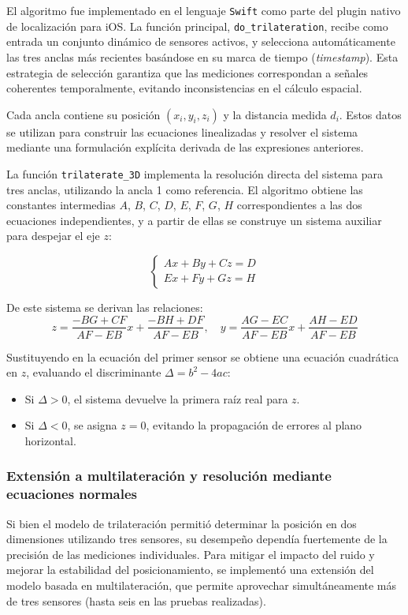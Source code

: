 El algoritmo fue implementado en el lenguaje \texttt{Swift} como parte del plugin nativo de localización para iOS. La función principal, \texttt{do\_trilateration}, recibe como entrada un conjunto dinámico de sensores activos, y selecciona automáticamente las tres anclas más recientes basándose en su marca de tiempo (\textit{timestamp}). Esta estrategia de selección garantiza que las mediciones correspondan a señales coherentes temporalmente, evitando inconsistencias en el cálculo espacial.

Cada ancla contiene su posición $(x_i, y_i, z_i)$ y la distancia medida $d_i$. Estos datos se utilizan para construir las ecuaciones linealizadas y resolver el sistema mediante una formulación explícita derivada de las expresiones anteriores.

La función \texttt{trilaterate\_3D} implementa la resolución directa del sistema para tres anclas, utilizando la ancla 1 como referencia. El algoritmo obtiene las constantes intermedias $A$, $B$, $C$, $D$, $E$, $F$, $G$, $H$ correspondientes a las dos ecuaciones independientes, y a partir de ellas se construye un sistema auxiliar para despejar el eje $z$:

\[
\begin{cases}
A x + B y + C z = D \\
E x + F y + G z = H
\end{cases}
\]

De este sistema se derivan las relaciones:
\[
z = \frac{-B G + C F}{A F - E B}x + \frac{-B H + D F}{A F - E B}, \quad
y = \frac{A G - E C}{A F - E B}x + \frac{A H - E D}{A F - E B}
\]

Sustituyendo en la ecuación del primer sensor se obtiene una ecuación cuadrática en $z$, evaluando el discriminante $\Delta = b^2 - 4ac$:
\begin{itemize}
    \item Si $\Delta > 0$, el sistema devuelve la primera raíz real para $z$.
    \item Si $\Delta < 0$, se asigna $z=0$, evitando la propagación de errores al plano horizontal.
\end{itemize}

\subsubsection*{Extensión a multilateración y resolución mediante ecuaciones normales}

Si bien el modelo de trilateración permitió determinar la posición en dos dimensiones utilizando tres sensores, su desempeño dependía fuertemente de la precisión de las mediciones individuales. Para mitigar el impacto del ruido y mejorar la estabilidad del posicionamiento, se implementó una extensión del modelo basada en multilateración, que permite aprovechar simultáneamente más de tres sensores (hasta seis en las pruebas realizadas).

